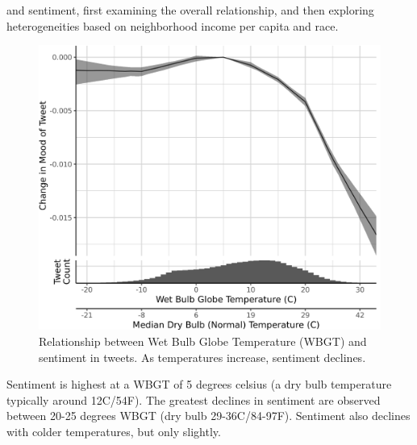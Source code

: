 \documentclass{article}
\begin{document}
and sentiment, first examining the overall relationship, and then exploring heterogeneities based on neighborhood income per capita and race.

\begin{figure}[H]
  \centering
  \includegraphics[width=0.5\linewidth]{../res/wbgt.png}
  \caption{Relationship between Wet Bulb Globe Temperature (WBGT) and sentiment in tweets.  As temperatures increase, sentiment declines.}
  \label{fig:wbgt-income}
\end{figure}

Sentiment is highest at a WBGT of 5 degrees celsius (a dry bulb temperature typically around 12C/54F).  The greatest declines in sentiment are observed between 20-25 degrees WBGT (dry bulb 29-36C/84-97F).  Sentiment also declines with colder temperatures, but only slightly.   
\end{document}
